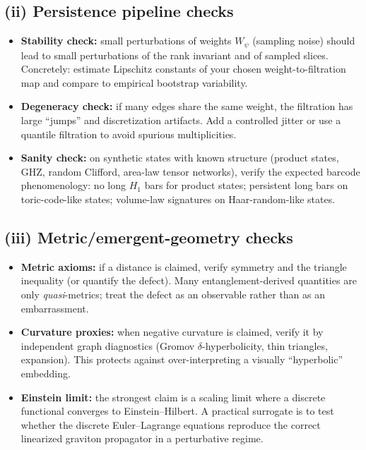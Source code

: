\documentclass[11pt,oneside]{amsbook}
\numberwithin{equation}{section}
\theoremstyle{plain}
\theoremstyle{definition}
\theoremstyle{remark}
\begin{document}
\subsection*{(ii) Persistence pipeline checks}
\begin{itemize}
\item \textbf{Stability check:} small perturbations of weights $W_\psi$ (sampling noise) should lead to small perturbations of the rank invariant and of sampled slices. Concretely: estimate Lipschitz constants of your chosen weight-to-filtration map and compare to empirical bootstrap variability.
\item \textbf{Degeneracy check:} if many edges share the same weight, the filtration has large ``jumps'' and discretization artifacts.
Add a controlled jitter or use a quantile filtration to avoid spurious multiplicities.
\item \textbf{Sanity check:} on synthetic states with known structure (product states, GHZ, random Clifford, area-law tensor networks), verify the expected barcode phenomenology:
no long $H_1$ bars for product states; persistent long bars on toric-code-like states; volume-law signatures on Haar-random-like states.
\end{itemize}

\subsection*{(iii) Metric/emergent-geometry checks}
\begin{itemize}
\item \textbf{Metric axioms:} if a distance is claimed, verify symmetry and the triangle inequality (or quantify the defect).
Many entanglement-derived quantities are only \emph{quasi}-metrics; treat the defect as an observable rather than as an embarrassment.
\item \textbf{Curvature proxies:} when negative curvature is claimed, verify it by independent graph diagnostics (Gromov $\delta$-hyperbolicity, thin triangles, expansion).
This protects against over-interpreting a visually ``hyperbolic'' embedding.
\item \textbf{Einstein limit:} the strongest claim is a scaling limit where a discrete functional converges to Einstein--Hilbert.
A practical surrogate is to test whether the discrete Euler--Lagrange equations reproduce the correct linearized graviton propagator in a perturbative regime.
\end{itemize}
\end{document}
